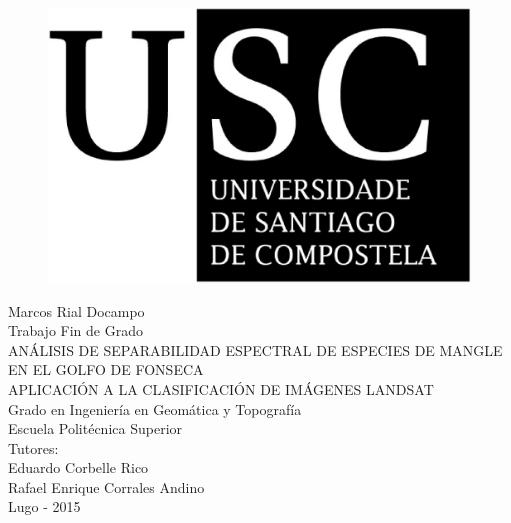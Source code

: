 




\begin{figure}[t]
\centering
\includegraphics[scale=0.15]{./Imagenes/USCbn.eps} %
\end{figure}

\begin{center}
\vspace*{2cm}
{\LARGE Marcos Rial Docampo}\\[2cm]
{\LARGE Trabajo Fin de Grado}\\[1cm]
{\LARGE ANÁLISIS DE SEPARABILIDAD ESPECTRAL DE ESPECIES DE MANGLE EN EL GOLFO DE FONSECA}\\
{\LARGE APLICACIÓN A LA CLASIFICACIÓN DE IMÁGENES LANDSAT}\\[2cm]
{\Large Grado en Ingeniería en Geomática y Topografía\\Escuela Politécnica Superior}\\[1cm]
{\Large \vfill{\normalsize{Tutores:\\Eduardo Corbelle Rico\\Rafael Enrique Corrales Andino}}}\\
{\footnotesize \vfill{Lugo - 2015}}
\end{center}